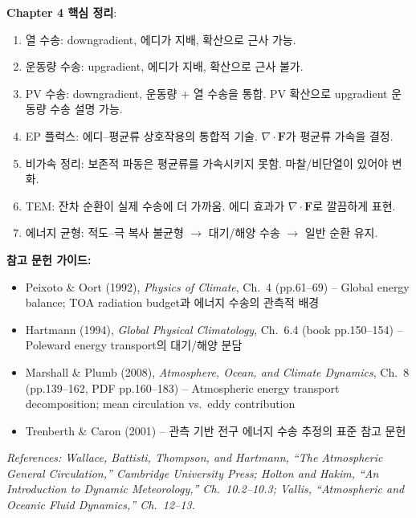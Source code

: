 \begin{hisublock}
\textbf{Chapter 4 핵심 정리}:
\begin{enumerate}
  \item 열 수송: downgradient, 에디가 지배, 확산으로 근사 가능.
  \item 운동량 수송: upgradient, 에디가 지배, 확산으로 근사 불가.
  \item PV 수송: downgradient, 운동량 + 열 수송을 통합.  PV 확산으로 upgradient 운동량 수송 설명 가능.
  \item EP 플럭스: 에디--평균류 상호작용의 통합적 기술.  $\nabla\cdot\mathbf{F}$가 평균류 가속을 결정.
  \item 비가속 정리: 보존적 파동은 평균류를 가속시키지 못함.  마찰/비단열이 있어야 변화.
  \item TEM: 잔차 순환이 실제 수송에 더 가까움.  에디 효과가 $\nabla\cdot\mathbf{F}$로 깔끔하게 표현.
  \item 에너지 균형: 적도--극 복사 불균형 $\to$ 대기/해양 수송 $\to$ 일반 순환 유지.
\end{enumerate}
\end{hisublock}

\begin{hisublock}
\textbf{참고 문헌 가이드:}
\begin{itemize}
  \item Peixoto \& Oort (1992), \textit{Physics of Climate}, Ch.~4 (pp.61--69) -- Global energy balance; TOA radiation budget과 에너지 수송의 관측적 배경 
  \item Hartmann (1994), \textit{Global Physical Climatology}, Ch.~6.4 (book pp.150--154) -- Poleward energy transport의 대기/해양 분담 
  \item Marshall \& Plumb (2008), \textit{Atmosphere, Ocean, and Climate Dynamics}, Ch.~8 (pp.139--162, PDF pp.160--183) -- Atmospheric energy transport decomposition; mean circulation vs.\ eddy contribution
  \item Trenberth \& Caron (2001) -- 관측 기반 전구 에너지 수송 추정의 표준 참고 문헌
\end{itemize}
\end{hisublock}

\vspace{6pt}
\noindent\textit{References:
Wallace, Battisti, Thompson, and Hartmann, ``The Atmospheric General
Circulation,'' Cambridge University Press;
Holton and Hakim, ``An Introduction to Dynamic Meteorology,''
Ch.~10.2--10.3;
Vallis, ``Atmospheric and Oceanic Fluid Dynamics,'' Ch.~12--13.}

